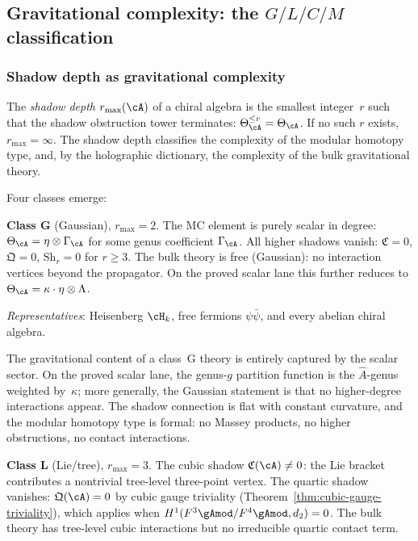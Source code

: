 \subsection*{Gravitational complexity: the $G/L/C/M$ classification}

\subsubsection*{Shadow depth as gravitational complexity}

The \emph{shadow depth} $r_{\max}(\cA)$ of a chiral algebra is
the smallest integer~$r$ such that the shadow obstruction tower
terminates: $\Theta_\cA^{\le r}=\Theta_\cA$. If no such $r$
exists, $r_{\max}=\infty$. The shadow depth classifies the
complexity of the modular homotopy type, and, by the holographic
dictionary, the complexity of the bulk gravitational theory.

Four classes emerge:

\medskip\noindent
\textbf{Class G} (Gaussian), $r_{\max}=2$.\enspace
The MC element is purely scalar in degree:
$\Theta_\cA=\eta\otimes\Gamma_\cA$ for some genus coefficient
$\Gamma_\cA$. All higher shadows vanish: $\mathfrak C=0$,
$\mathfrak Q=0$, $\mathrm{Sh}_r=0$ for $r\ge 3$. The bulk
theory is free (Gaussian): no interaction vertices beyond the
propagator. On the proved scalar lane this further reduces to
$\Theta_\cA=\kappa\cdot\eta\otimes\Lambda$.

\emph{Representatives}: Heisenberg $\cH_k$, free fermions
$\psi\bar\psi$, and every abelian chiral algebra.

The gravitational content of a class~G theory is entirely
captured by the scalar sector. On the proved scalar lane, the
genus-$g$ partition function is the $\hat A$-genus weighted
by~$\kappa$; more generally, the Gaussian statement is that no
higher-degree interactions appear. The shadow connection is flat
with constant curvature, and the modular homotopy type is
formal: no Massey products, no higher obstructions, no contact
interactions.

\medskip\noindent
\textbf{Class L} (Lie/tree), $r_{\max}=3$.\enspace
The cubic shadow $\mathfrak C(\cA)\neq 0$: the Lie bracket
contributes a nontrivial tree-level three-point vertex. The
quartic shadow vanishes:
$\mathfrak Q(\cA)=0$ by cubic gauge triviality
(Theorem~\ref{thm:cubic-gauge-triviality}), which applies when
$H^1(F^3\gAmod/F^4\gAmod,d_2)=0$. The bulk theory has
tree-level cubic interactions but no irreducible quartic contact
term.

